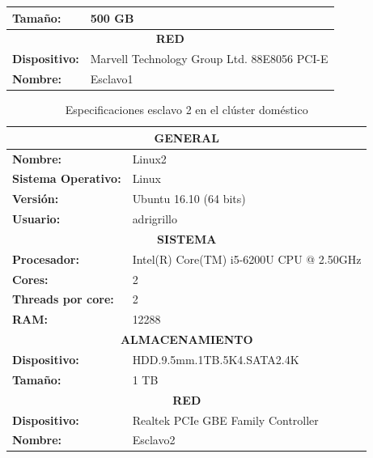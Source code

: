 \begin{table}[htp!]
\begin{tabular}{|l|l|}
		\textbf{Tamaño:}            & 500 GB                                                                  \\ \hline
		\multicolumn{2}{|c|}{\textbf{RED}}                                                                    \\ \hline
		\textbf{Dispositivo:}       & Marvell Technology Group Ltd. 88E8056 PCI-E \\ \hline
		\textbf{Nombre:}            & Esclavo1                                                                \\ \hline
	\end{tabular}
\end{table}

\begin{table}[htp!]
	\centering
	\caption{Especificaciones esclavo 2 en el clúster doméstico}
	\label{esclavo2}
	\begin{tabular}{|l|l|}
		\hline
		\multicolumn{2}{|c|}{\textbf{GENERAL}}                                 \\ \hline
		\textbf{Nombre:}            & Linux2                                   \\ \hline
		\textbf{Sistema Operativo:} & Linux                                    \\ \hline
		\textbf{Versión:}           & Ubuntu 16.10 (64 bits)                   \\ \hline
		\textbf{Usuario:}           & adrigrillo                               \\ \hline
		\multicolumn{2}{|c|}{\textbf{SISTEMA}}                                 \\ \hline
		\textbf{Procesador:}        & Intel(R) Core(TM) i5-6200U CPU @ 2.50GHz \\ \hline
		\textbf{Cores:}             & 2                                        \\ \hline
		\textbf{Threads por core:}  & 2                                        \\ \hline
		\textbf{RAM:}               & 12288                                    \\ \hline
		\multicolumn{2}{|c|}{\textbf{ALMACENAMIENTO}}                          \\ \hline
		\textbf{Dispositivo:}       & HDD.9.5mm.1TB.5K4.SATA2.4K               \\ \hline
		\textbf{Tamaño:}            & 1 TB                                     \\ \hline
		\multicolumn{2}{|c|}{\textbf{RED}}                                     \\ \hline
		\textbf{Dispositivo:}       & Realtek PCIe GBE Family Controller       \\ \hline
		\textbf{Nombre:}            & Esclavo2                                 \\ \hline
	\end{tabular}
\end{table}

